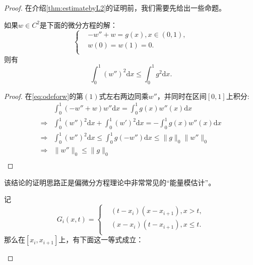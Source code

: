 \documentclass[lang=cn,10pt,newtx]{elegantbook}
\newcommand{\dif}{\mathrm{d}}
\newcommand{\norm}[1]{\|#1\|}
\begin{document}
\begin{proof}
在介绍\ref{thm:estimatebyL2}的证明前，我们需要先给出一些命题。
\newpage
\begin{proposition}
  \label{prop:enermy}
  如果$w\in C^{2}$是下面的微分方程的解：
  \begin{equation}
    \label{eq:odeforw}
    \left\{
      \begin{aligned}
        &-w''+w=g(x),x\in(0,1),\\
        &w(0)=w(1)=0.\\
      \end{aligned}
    \right.
  \end{equation}
  则有
  \begin{equation}
    \label{eq:enermy-norm}
  \int_{0}^{1}(w'')^{2}\dif x\le\int_{0}^{1}g^{2}\dif x.
  \end{equation}
\end{proposition}
\begin{proof}
  在\eqref{eq:odeforw}的第$(1)$式左右两边同乘$w''$，并同时在区间$[0,1]$上积分: 
  \begin{equation}
    \begin{aligned}
      &\int_{0}^{1}(-w''+w)w''\dif x=\int_{0}^{1}g(x)w''(x)\dif x\\
      \Rightarrow&\int_{0}^{1}(w'')^{2}\dif x+\int_{0}^{1}(w')^{2}\dif x=-\int_{0}^{1}g(x)w''(x)\dif x\\
      \Rightarrow&\int_{0}^{1}(w'')^{2}\dif x\le\int_{0}^{1}g(-w'')\dif x\le \norm{g}_{0}\norm{w''}_{0}\\
      \Rightarrow&\norm{w''}_{0}\le\norm{g}_{0}\\
    \end{aligned}
  \end{equation}
\end{proof}
\begin{remark}
  该结论的证明思路正是偏微分方程理论中非常常见的“能量模估计”。
\end{remark}
\begin{proposition}
  \label{prop:Gxt}
  记
  \begin{equation}
    \label{eq:Gxt}
    G_{i}(x,t)=\left\{
      \begin{aligned}
        &(t-x_i)(x-x_{i+1}),x>t ,\\
        &(x-x_{i})(t-x_{i+1}),x\le t.\\
      \end{aligned}
    \right.
  \end{equation}
  那么在$[x_{i},x_{i+1}]$上，有下面这一等式成立：
  \begin{equation}

\end{equation}
\end{proposition}
\end{proof}
\end{document}
